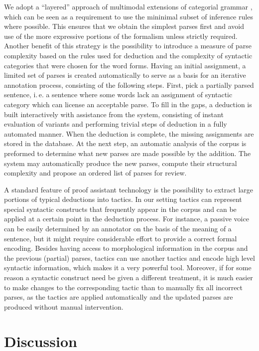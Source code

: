 \documentclass[a4paper]{article}
\theoremstyle{example-style}
\begin{document}
We adopt a ``layered'' approach of multimodal extensions of categorial grammar \parencite{morrill1994type,baldridge2003multi}, which can be seen as a requirement to use the mininimal subset of inference rules where possible. This ensures that we obtain the simplest parses first and avoid use of the more expressive portions of the formalism unless strictly required. Another benefit of this strategy is the possibility to introduce a measure of parse complexity based on the rules used for deduction and the complexity of syntactic categories that were chosen for the word forms. Having an initial assignment, a limited set of parses is created automatically to serve as a basis for an iterative annotation process, consisting of the following steps. First, pick a partially parsed sentence, i.\,e. a sentence where some words lack an assignment of syntactic category which can license an acceptable parse. To fill in the gaps, a deduction is built interactively with assistance from the system, consisting of instant evaluation of variants and performing trivial steps of deduction in a fully automated manner. When the deduction is complete, the missing assignments are stored in the database. At the next step, an automatic analysis of the corpus is preformed to determine what new parses are made possible by the addition. The system may automatically produce the new parses, compute their structural complexity and propose an ordered list of parses for review. 

A standard feature of proof assistant technology is the possibility to extract large portions of typical deductions into tactics. In our setting tactics can represent special syntactic constructs that frequently appear in the corpus and can be applied at a certain point in the deduction process. For instance, a passive voice can be easily determined by an annotator on the basis of the meaning of a sentence, but it might require considerable effort to provide a correct formal encoding. Besides having access to morphological information in the corpus and the previous (partial) parses, tactics can use another tactics and encode high level syntactic information, which makes it a very powerful tool. Moreover, if for some reason a syntactic construct need be given a different treatment, it is much easier to make changes to the corresponding tactic than to manually fix all incorrect parses, as the tactics are applied automatically and the updated parses are produced without manual intervention.
  

\section{Discussion}
\end{document}
